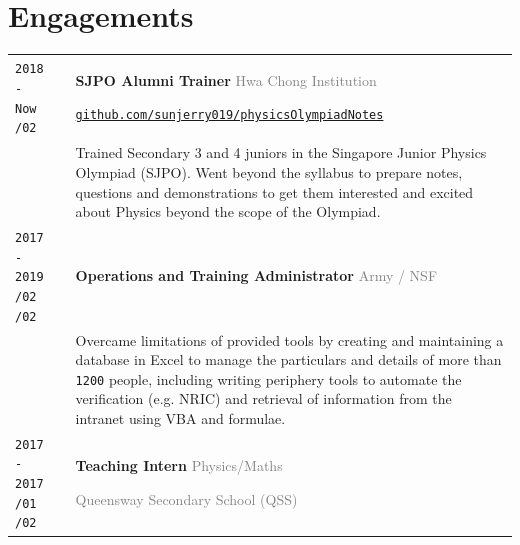 \documentclass[11pt]{article}
\newcommand{\monoSp}[1]{{\usefont{T1}{rbtm}{m}{n} #1}}
\newcommand{\urllinkout}[2]{\href{#1}{\textcolor{text_link}{\small \texttt{#2}}}}
\newcommand{\code}[1]{\monoSp{#1}}
\newcommand{\nummer}[1]{\texttt{\large #1}}
\begin{document}
\section{\textcolor{section_3}{Engagements}}
\vspace{-\baselineskip}
{
	\renewcommand{\arraystretch}{2}
	\renewcommand{\cellalign}{lt}
	\begin{tabularx}{\textwidth}{@{}l p{0.20cm} X @{}}
		\makecell{\texttt{\large 2018 - Now} \vspace{-1mm} \\ \texttt{\footnotesize /02}} & & \textbf{SJPO Alumni Trainer} \hfill \textcolor{gray}{Hwa Chong Institution} \par \urllinkout{http://github.com/sunjerry019/physicsOlympiadNotes}{github.com/sunjerry019/physicsOlympiadNotes} \\[-0.5em]
		& & {\small Trained Secondary 3 and 4 juniors in the Singapore Junior Physics Olympiad {\footnotesize (SJPO)}. Went beyond the syllabus to prepare notes, questions and demonstrations to get them interested and excited about Physics beyond the scope of the Olympiad.} \\
		\makecell{\texttt{\large 2017 - 2019} \vspace{-1mm} \\ \texttt{\footnotesize /02} \hspace{1.5em} \texttt{\footnotesize /02}} & & \textbf{Operations and Training Administrator} \hfill \textcolor{gray}{Army / NSF} \\[-0.5em]
		& & {\small Overcame limitations of provided tools by creating and maintaining a database in Excel to manage the particulars and details of more than \nummer{1200} people, including writing periphery tools to automate the verification {\footnotesize(e.g. NRIC)} and retrieval of information from the intranet using \code{VBA} and formulae. }\\
		\makecell{\texttt{\large 2017 - 2017} \vspace{-1mm} \\ \texttt{\footnotesize /01} \hspace{1.5em} \texttt{\footnotesize /02}} & & \textbf{Teaching Intern} \hfill \textcolor{gray}{Physics/Maths} \par \textcolor{gray}{Queensway Secondary School {\footnotesize (QSS)}}\\[-0.5em]

\end{tabularx}}
\end{document}
